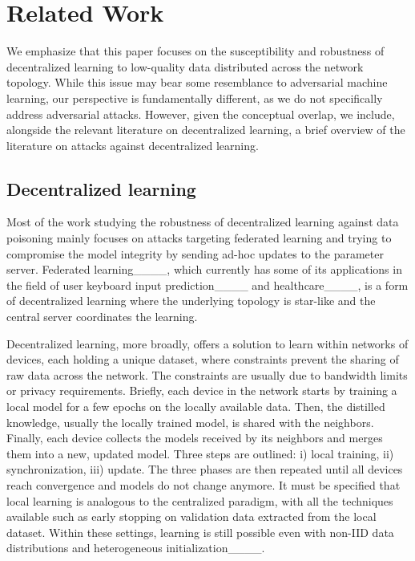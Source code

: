 \section{Related Work}
We emphasize that this paper focuses on the susceptibility and robustness of decentralized learning to low-quality data distributed across the network topology. While this issue may bear some resemblance to adversarial machine learning, our perspective is fundamentally different, as we do not specifically address adversarial attacks. However, given the conceptual overlap, we include, alongside the relevant literature on decentralized learning, a brief overview of the literature on attacks against decentralized learning.

\subsection{Decentralized learning}
Most of the work studying the robustness of decentralized learning against data poisoning mainly focuses on attacks targeting federated learning and trying to compromise the model integrity by sending ad-hoc updates to the parameter server. Federated learning____, which currently has some of its applications in the field of user keyboard input prediction____ and healthcare____, is a form of decentralized learning where the underlying topology is star-like and the central server coordinates the learning. 

Decentralized learning, more broadly, offers a solution to learn within networks of devices, each holding a unique dataset, where constraints prevent the sharing of raw data across the network. The constraints are usually due to bandwidth limits or privacy requirements. Briefly, each device in the network starts by training a local model for a few epochs on the locally available data. Then, the distilled knowledge, usually the locally trained model, is shared with the neighbors. Finally, each device collects the models received by its neighbors and merges them into a new, updated model. Three steps are outlined: i) local training, ii) synchronization, iii) update. The three phases are then repeated until all devices reach convergence and models do not change anymore. It must be specified that local learning is analogous to the centralized paradigm, with all the techniques available such as early stopping on validation data extracted from the local dataset. Within these settings, learning is still possible even with non-IID data distributions and heterogeneous initialization____. 

